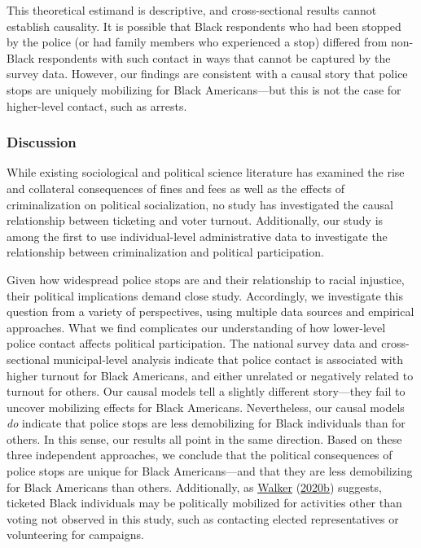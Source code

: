 \documentclass[
  12pt,
]{article}
\begin{document}
This theoretical estimand is descriptive, and cross-sectional results cannot establish causality. It is possible that Black respondents who had been stopped by the police (or had family members who experienced a stop) differed from non-Black respondents with such contact in ways that cannot be captured by the survey data. However, our findings are consistent with a causal story that police stops are uniquely mobilizing for Black Americans---but this is not the case for higher-level contact, such as arrests.

\hypertarget{discussion}{%
\subsubsection*{Discussion}\label{discussion}}

While existing sociological and political science literature has examined the rise and collateral consequences of fines and fees as well as the effects of criminalization on political socialization, no study has investigated the causal relationship between ticketing and voter turnout. Additionally, our study is among the first to use individual-level administrative data to investigate the relationship between criminalization and political participation.

Given how widespread police stops are and their relationship to racial injustice, their political implications demand close study. Accordingly, we investigate this question from a variety of perspectives, using multiple data sources and empirical approaches. What we find complicates our understanding of how lower-level police contact affects political participation. The national survey data and cross-sectional municipal-level analysis indicate that police contact is associated with higher turnout for Black Americans, and either unrelated or negatively related to turnout for others. Our causal models tell a slightly different story---they fail to uncover mobilizing effects for Black Americans. Nevertheless, our causal models \emph{do} indicate that police stops are less demobilizing for Black individuals than for others. In this sense, our results all point in the same direction. Based on these three independent approaches, we conclude that the political consequences of police stops are unique for Black Americans---and that they are less demobilizing for Black Americans than others. Additionally, as \protect\hyperlink{ref-Walker2020a}{Walker} (\protect\hyperlink{ref-Walker2020a}{2020b}) suggests, ticketed Black individuals may be politically mobilized for activities other than voting not observed in this study, such as contacting elected representatives or volunteering for campaigns.
\end{document}
